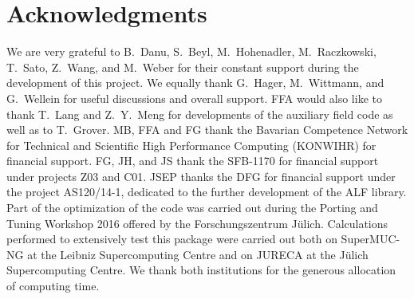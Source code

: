 

\section*{Acknowledgments} 

%

We are very grateful to  B.~Danu, S.~Beyl, M.~Hohenadler,  M.~Raczkowski, T.~Sato, Z.~Wang, and M.~Weber for their constant support during the development of this project.
We equally thank G.~Hager, M.~Wittmann, and G.~Wellein for useful discussions and overall support.
FFA would also like to thank T.~Lang  and Z.~Y.~Meng for developments of the auxiliary field code as well as to T.~Grover. 
MB, FFA  and FG thank the Bavarian Competence Network for Technical and Scientific High Performance Computing (KONWIHR) for financial support.
FG, JH, and JS thank the SFB-1170 for  financial support under projects Z03 and C01.   JSEP  thanks the DFG for financial support under the project AS120/14-1, dedicated to the further development of the ALF library.
Part of the optimization of the code was carried out during  the  Porting and Tuning Workshop 2016 offered by the Forschungszentrum J\"ulich.
Calculations performed to extensively test this package were carried out both on  SuperMUC-NG at the  Leibniz Supercomputing Centre and on  JURECA  \cite{Jureca16} at the J\"ulich Supercomputing Centre.  We thank both institutions for the generous allocation of computing time.
